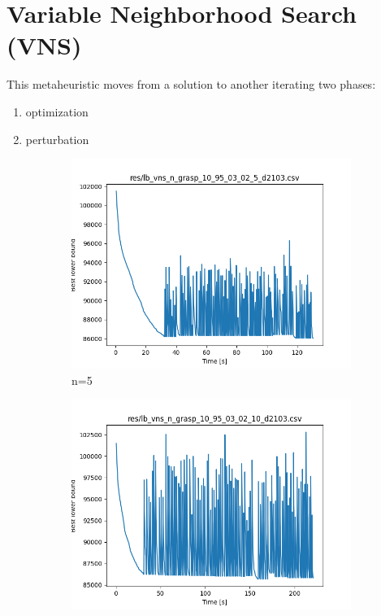 \section{Variable Neighborhood Search (VNS)}

This metaheuristic moves from a solution to another iterating two phases:
\begin{enumerate}
	\item optimization
	\item perturbation
\end{enumerate}

\begin{figure}[!h]
	\begin{subfigure}{.5\columnwidth}
		\centering
		\includegraphics[width=\columnwidth]{../res/lb_vns_n_grasp_10_95_03_02_5_d2103.png}
		\caption{n=5}
		\label{fig:lb_vns_n_grasp_10_95_03_02_5_d2103}
	\end{subfigure}
	\begin{subfigure}{.5\columnwidth}
		\centering
		\includegraphics[width=\columnwidth]{../res/lb_vns_n_grasp_10_95_03_02_10_d2103.png}

\end{subfigure}
\end{figure}
